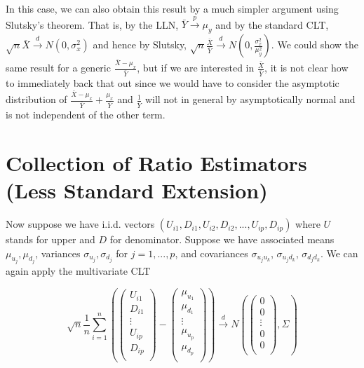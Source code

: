 \documentclass{article}
\begin{document}
In this case, we can also obtain this result by a much simpler argument using Slutsky's theorem. That is, by the LLN, $\bar{Y}\xrightarrow{p} \mu_y$ and by the standard CLT, $\sqrt{n}\bar{X} \xrightarrow{d} N(0,\sigma_x^2)$  and hence by Slutsky, $\sqrt{n}\frac{\bar{X}}{\bar{Y}} \xrightarrow{d} N(0,\frac{\sigma_x^2}{\mu_y^2})$. We could show the same result for a generic $\frac{\bar{X}-\mu_x}{\bar{Y}}$, but if we are interested in $\frac{\bar{X}}{\bar{Y}}$, it is not clear how to immediately back that out since we would have to consider the asymptotic distribution of $\frac{\bar{X}-\mu_x}{\bar{Y}} + \frac{\mu_x}{\bar{Y}}$ and $\frac{1}{\bar{Y}}$ will not in general by asymptotically normal and is not independent of the other term.



\newpage 
\section{Collection of Ratio Estimators (Less Standard Extension)}

Now suppose we have i.i.d. vectors $(U_{i1},D_{i1},U_{i2},D_{i2},...,U_{ip},D_{ip})$ where $U$ stands for upper and $D$ for denominator. Suppose we have associated means $\mu_{u_j},\mu_{d_j}$, variances $\sigma_{u_j},\sigma_{d_j}$ for $j=1,...,p$, and covariances $\sigma_{u_ju_k}$, $\sigma_{u_jd_k}$, $\sigma_{d_jd_k}$. We can again apply the multivariate CLT

\begin{equation*} \sqrt{n} \frac{1}{n}\sum_{i=1}^{n}
    \left(\left(\begin{array}{c}
        U_{i1}  \\
        D_{i1}  \\ 
        \vdots \\ 
        U_{ip}\\
        D_{ip}\\
    \end{array}\right) - \left(\begin{array}{c}
        \mu_{u_1}  \\
        \mu_{d_1}  \\ 
        \vdots \\ 
        \mu_{u_p}  \\
        \mu_{d_p}  \\ 
    \end{array}\right)\right) \xrightarrow{d}
    N\left(\left(\begin{array}{c}
        0  \\
        0  \\
        \vdots \\
        0  \\
        0  \\
    \end{array}\right),\Sigma \right)
\end{equation*}
\end{document}

